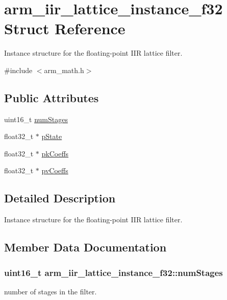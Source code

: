 \hypertarget{structarm__iir__lattice__instance__f32}{}\section{arm\+\_\+iir\+\_\+lattice\+\_\+instance\+\_\+f32 Struct Reference}
\label{structarm__iir__lattice__instance__f32}


Instance structure for the floating-\/point I\+IR lattice filter.  




{\ttfamily \#include $<$arm\+\_\+math.\+h$>$}

\subsection*{Public Attributes}
\begin{DoxyCompactItemize}
\item 
uint16\+\_\+t \hyperlink{structarm__iir__lattice__instance__f32_af8de449af5efe1f30be82f9ba35587ee}{num\+Stages}
\item 
float32\+\_\+t $\ast$ \hyperlink{structarm__iir__lattice__instance__f32_a30babe7815510219e6e3d28e6e4a5969}{p\+State}
\item 
float32\+\_\+t $\ast$ \hyperlink{structarm__iir__lattice__instance__f32_aa69fcdd3775e828d450ce1bbd978fa31}{pk\+Coeffs}
\item 
float32\+\_\+t $\ast$ \hyperlink{structarm__iir__lattice__instance__f32_afc7c8f577e6f27d097fe55f57e707f72}{pv\+Coeffs}
\end{DoxyCompactItemize}


\subsection{Detailed Description}
Instance structure for the floating-\/point I\+IR lattice filter. 

\subsection{Member Data Documentation}
\subsubsection[{\texorpdfstring{num\+Stages}{numStages}}]{\setlength{\rightskip}{0pt plus 5cm}uint16\+\_\+t arm\+\_\+iir\+\_\+lattice\+\_\+instance\+\_\+f32\+::num\+Stages}\hypertarget{structarm__iir__lattice__instance__f32_af8de449af5efe1f30be82f9ba35587ee}{}\label{structarm__iir__lattice__instance__f32_af8de449af5efe1f30be82f9ba35587ee}
number of stages in the filter. 
